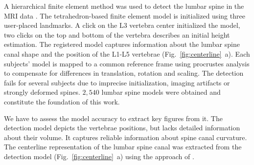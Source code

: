 \documentclass[a4paper,twoside]{style/article}
\newcommand{\com}[1]{\textcolor{orange}{\uline{#1}}}
\begin{document}
A hierarchical finite element method was used to detect the lumbar spine in the MRI data \cite{Rak2013}.
The tetrahedron-based finite element model is initialized using three user-placed landmarks.
A click on the L3 vertebra center initialized the model, two clicks on the top and bottom of the vertebra describes an initial height estimation.
The registered model captures information about the lumbar spine canal shape and the position of the L1-L5 vertebrae \cite{Klemm2013VMV} (Fig.~\ref{fig:centerline}~a).
Each subjects' model is mapped to a common reference frame using procrustes analysis to compensate for differences in translation, 
rotation and scaling.
The detection fails for several subjects due to imprecise initialization, imaging artifacts or strongly deformed spines.
$2,540$ lumbar spine models were obtained and constitute the foundation of this work.

We have to assess the model accuracy to extract key figures from it.
The detection model depicts the vertebrae positions, but lacks detailed information about their volume.
It captures reliable information about spine canal curvature.
The centerline representation of the lumbar spine canal was extracted from the detection model (Fig.~\ref{fig:centerline}~a) using the approach of \cite{Klemm2013VMV}.
\end{document}
